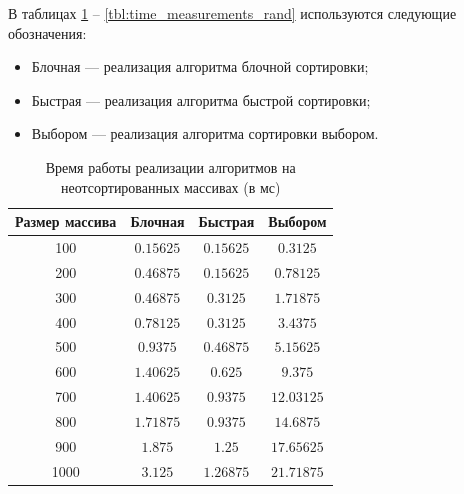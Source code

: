 В таблицах \ref{tbl:time_measurements} -- \ref{tbl:time_measurements_rand} используются следующие обозначения: 
\begin{itemize}
	\item Блочная --- реализация алгоритма блочной сортировки;
	\item Быстрая --- реализация алгоритма быстрой сортировки;
	\item Выбором --- реализация алгоритма сортировки выбором.
\end{itemize}

\begin{table}[h]
	\begin{center}
		\begin{threeparttable}
			\captionsetup{justification=raggedright,singlelinecheck=off}
			\caption{Время работы реализации алгоритмов на неотсортированных массивах (в мс)}
			\label{tbl:time_measurements}
			\begin{tabular}{|c|c|c|c|}
				\hline
				Размер массива & Блочная & Быстрая & Выбором \\
				\hline
				100 &$ 0.15625 $&$ 0.15625 $&$ 0.3125 $\\
				\hline
				200 &$ 0.46875 $&$ 0.15625 $&$ 0.78125 $\\
				\hline
				300 &$ 0.46875 $&$ 0.3125 $&$ 1.71875 $\\
				\hline
				400 &$ 0.78125 $&$ 0.3125 $&$ 3.4375 $\\
				\hline
				500 &$ 0.9375 $&$ 0.46875 $&$ 5.15625 $\\
				\hline
				600 &$ 1.40625 $&$ 0.625 $&$ 9.375 $\\
				\hline
				700 &$ 1.40625 $&$ 0.9375 $&$ 12.03125 $\\
				\hline
				800 &$ 1.71875 $&$ 0.9375 $&$ 14.6875 $\\
				\hline
				900 &$ 1.875 $&$ 1.25 $&$ 17.65625 $\\
				\hline
				1000 &$ 3.125 $&$ 1.26875 $&$ 21.71875 $\\
				\hline
			\end{tabular}
		\end{threeparttable}
	\end{center}
\end{table}

